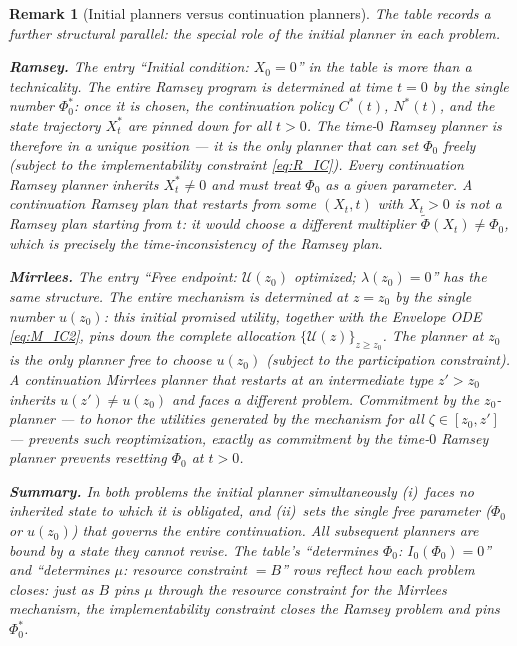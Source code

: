 \documentclass[12pt]{article}
\newtheorem{remark}{Remark}
\newcommand{\calU}{\mathcal{U}}
\newcommand{\zlow}{z_{0}}
\begin{document}
\begin{remark}[Initial planners versus continuation planners]
\label{rem:t0_special}
The table records a further structural parallel: the special role of the
\emph{initial} planner in each problem.

\medskip
\noindent\textbf{Ramsey.}
The entry ``Initial condition: $X_0 = 0$'' in the table is more than a
technicality.  The entire Ramsey program is determined at time $t=0$ by the
single number $\Phi_0^*$: once it is chosen, the continuation policy $C^*(t)$,
$N^*(t)$, and the state trajectory $X_t^*$ are pinned down for all $t > 0$.
The time-$0$ Ramsey planner is therefore in a unique position --- it is the
only planner that can set $\Phi_0$ freely (subject to the implementability
constraint \eqref{eq:R_IC}).  Every continuation Ramsey planner inherits
$X_t^* \ne 0$ and must treat $\Phi_0$ as a given parameter.  A continuation
Ramsey plan that restarts from some $(X_t, t)$ with $X_t > 0$ is
\emph{not} a Ramsey plan starting from $t$: it would choose a different
multiplier $\widetilde{\Phi}(X_t) \ne \Phi_0$, which is precisely the
time-inconsistency of the Ramsey plan.

\medskip
\noindent\textbf{Mirrlees.}
The entry ``Free endpoint: $\calU(\zlow)$ optimized; $\lambda(\zlow)=0$''
has the same structure.  The entire mechanism is determined at $z=\zlow$ by
the single number $u(\zlow)$: this initial promised utility, together with
the Envelope ODE \eqref{eq:M_IC2}, pins down the complete allocation
$\{\calU(z)\}_{z\ge\zlow}$.  The planner at $\zlow$ is the only planner
free to choose $u(\zlow)$ (subject to the participation constraint).  A
continuation Mirrlees planner that restarts at an intermediate type
$z' > \zlow$ inherits $u(z') \ne u(\zlow)$ and faces a different problem.
Commitment by the $\zlow$-planner --- to honor the utilities generated by
the mechanism for all $\zeta \in [\zlow, z']$ --- prevents such
reoptimization, exactly as commitment by the time-$0$ Ramsey planner
prevents resetting $\Phi_0$ at $t > 0$.

\medskip
\noindent\textbf{Summary.}
In both problems the initial planner simultaneously (i)~faces no inherited
state to which it is obligated, and (ii)~sets the single free parameter
($\Phi_0$ or $u(\zlow)$) that governs the entire continuation.  All
subsequent planners are bound by a state they cannot revise.  The table's
``determines $\Phi_0$: $I_0(\Phi_0)=0$'' and ``determines $\mu$: resource
constraint $= B$'' rows reflect how each problem closes: just as $B$ pins $\mu$
through the resource constraint for the Mirrlees mechanism, the implementability
constraint closes the Ramsey problem and pins $\Phi_0^*$.
\end{remark}
\end{document}
